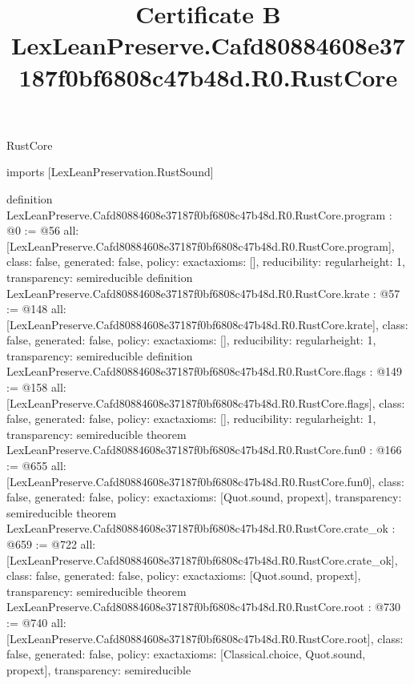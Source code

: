 \begin{lexlean}{RustCore}
\title{Certificate B LexLeanPreserve.Cafd80884608e37187f0bf6808c47b48d.R0.RustCore}
\begin{coremodule}
imports [LexLeanPreservation.RustSound]

definition LexLeanPreserve.Cafd80884608e37187f0bf6808c47b48d.R0.RustCore.program : @0 := @56 {
  all: [LexLeanPreserve.Cafd80884608e37187f0bf6808c47b48d.R0.RustCore.program],
  class: false,
  generated: false,
  policy: exact{axioms: []},
  reducibility: regular{height: 1},
  transparency: semireducible
}
definition LexLeanPreserve.Cafd80884608e37187f0bf6808c47b48d.R0.RustCore.krate : @57 := @148 {
  all: [LexLeanPreserve.Cafd80884608e37187f0bf6808c47b48d.R0.RustCore.krate],
  class: false,
  generated: false,
  policy: exact{axioms: []},
  reducibility: regular{height: 1},
  transparency: semireducible
}
definition LexLeanPreserve.Cafd80884608e37187f0bf6808c47b48d.R0.RustCore.flags : @149 := @158 {
  all: [LexLeanPreserve.Cafd80884608e37187f0bf6808c47b48d.R0.RustCore.flags],
  class: false,
  generated: false,
  policy: exact{axioms: []},
  reducibility: regular{height: 1},
  transparency: semireducible
}
theorem LexLeanPreserve.Cafd80884608e37187f0bf6808c47b48d.R0.RustCore.fun0 : @166 := @655 {
  all: [LexLeanPreserve.Cafd80884608e37187f0bf6808c47b48d.R0.RustCore.fun0],
  class: false,
  generated: false,
  policy: exact{axioms: [Quot.sound, propext]},
  transparency: semireducible
}
theorem LexLeanPreserve.Cafd80884608e37187f0bf6808c47b48d.R0.RustCore.crate_ok : @659 := @722 {
  all: [LexLeanPreserve.Cafd80884608e37187f0bf6808c47b48d.R0.RustCore.crate_ok],
  class: false,
  generated: false,
  policy: exact{axioms: [Quot.sound, propext]},
  transparency: semireducible
}
theorem LexLeanPreserve.Cafd80884608e37187f0bf6808c47b48d.R0.RustCore.root : @730 := @740 {
  all: [LexLeanPreserve.Cafd80884608e37187f0bf6808c47b48d.R0.RustCore.root],
  class: false,
  generated: false,
  policy: exact{axioms: [Classical.choice, Quot.sound, propext]},
  transparency: semireducible
}


\end{coremodule}
\end{lexlean}
